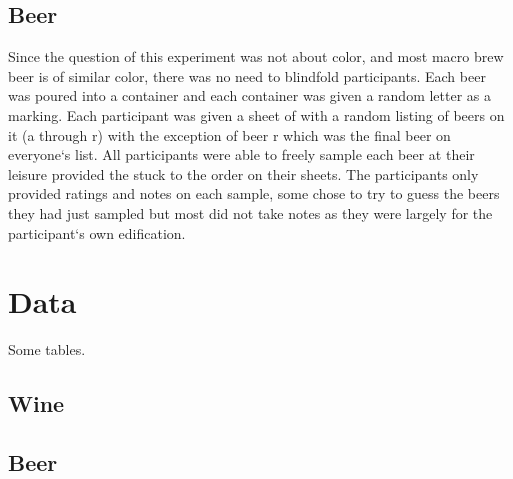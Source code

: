 \documentclass{aastex62}
\begin{document}
\subsection{Beer}
Since the question of this experiment was not about color, and most macro brew beer is of similar color, there was no need to blindfold participants.
Each beer was poured into a container and each container was given a random letter as a marking.
Each participant was given a sheet of with a random listing of beers on it  (a through r) with the exception of beer r which was the final beer on everyone`s list.
All participants were able to freely sample each beer at their leisure provided the stuck to the order on their sheets.
The participants only provided ratings and notes on each sample, some chose to try to guess the beers they had just sampled but most did not take notes as they were largely for the participant`s own edification.


\section{Data} \label{sec:style}
Some tables.

\subsection{Wine}

\subsection{Beer}
\end{document}
